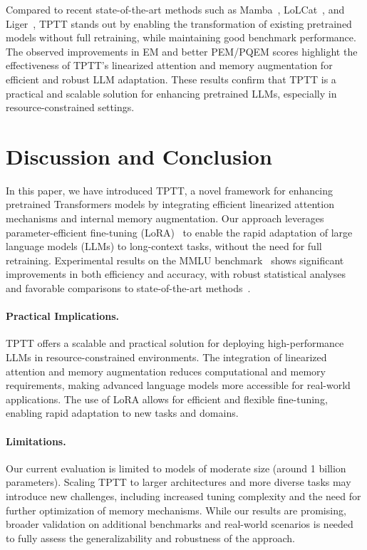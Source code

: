 \documentclass[10pt,a4paper]{article}
\begin{document}
Compared to recent state-of-the-art methods such as Mamba~\cite{gu2023mamba}, LoLCat~\cite{zhang2024lolcats}, and Liger~\cite{lan2025liger}, TPTT stands out by enabling the transformation of existing pretrained models without full retraining, while maintaining good benchmark performance. The observed improvements in EM and better PEM/PQEM scores highlight the effectiveness of TPTT's linearized attention and memory augmentation for efficient and robust LLM adaptation. These results confirm that TPTT is a practical and scalable solution for enhancing pretrained LLMs, especially in resource-constrained settings.


\section{Discussion and Conclusion}

In this paper, we have introduced TPTT, a novel framework for enhancing pretrained Transformers models by integrating efficient linearized attention mechanisms and internal memory augmentation. Our approach leverages parameter-efficient fine-tuning (LoRA)~\cite{hu2022lora} to enable the rapid adaptation of large language models (LLMs) to long-context tasks, without the need for full retraining. Experimental results on the MMLU benchmark~\cite{hendrycks2020measuring} shows significant improvements in both efficiency and accuracy, with robust statistical analyses and favorable comparisons to state-of-the-art methods~\cite{gu2023mamba, zhang2024lolcats, lan2025liger}.

\paragraph{Practical Implications.}
TPTT offers a scalable and practical solution for deploying high-performance LLMs in resource-constrained environments. The integration of linearized attention and memory augmentation reduces computational and memory requirements, making advanced language models more accessible for real-world applications. The use of LoRA allows for efficient and flexible fine-tuning, enabling rapid adaptation to new tasks and domains.

\paragraph{Limitations.}
Our current evaluation is limited to models of moderate size (around 1 billion parameters). Scaling TPTT to larger architectures and more diverse tasks may introduce new challenges, including increased tuning complexity and the need for further optimization of memory mechanisms. While our results are promising, broader validation on additional benchmarks and real-world scenarios is needed to fully assess the generalizability and robustness of the approach.
\end{document}
